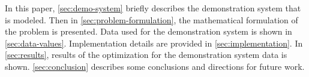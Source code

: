 In this paper, \cref{sec:demo-system} briefly describes the demonstration system that is modeled.
Then in \cref{sec:problem-formulation}, the mathematical formulation of the problem is presented.
Data used for the demonstration system is shown in \cref{sec:data-values}.
Implementation details are provided in \cref{sec:implementation}.
In \cref{sec:results}, results of the optimization for the demonstration system data is shown.
\cref{sec:conclusion} describes some conclusions and directions for future work.
